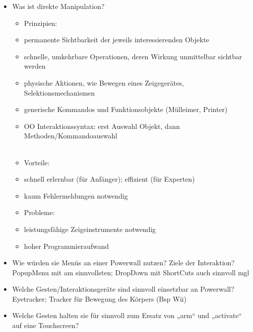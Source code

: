 \begin{itemize}
	\item Was ist direkte Manipulation?\\
	\begin{itemize}
		\item Prinzipien:
		\item permanente Sichtbarkeit der jeweils interessierenden Objekte
		\item schnelle, umkehrbare Operationen, deren Wirkung unmittelbar sichtbar werden
		\item physische Aktionen, wie Bewegen eines Zeigegerätes, Selektionsmechanismen
		\item generische Kommandos und Funktionsobjekte (Mülleimer, Printer)
		\item OO Interaktionssyntax: erst Auswahl Objekt, dann Methoden/Kommandoauswahl
		\\\\
		\item Vorteile:
		\item schnell erlernbar (für Anfänger); effizient (für Experten)
		\item kaum Fehlermeldungen notwendig
		\item Probleme:
		\item leistungsfähige Zeigeinstrumente notwendig
		\item hoher Programmieraufwand
	\end{itemize}
	\item Wie würden sie Menüs an einer Powerwall nutzen? Ziele der Interaktion?\\
	PopupMenu mit am sinnvollsten; DropDown mit ShortCuts auch sinnvoll mgl\\
	\item Welche Gesten/Interaktionsgeräte sind sinnvoll einsetzbar an Powerwall?\\
	Eyetracker; Tracker für Bewegung des Körpers (Bsp Wii)
	
	\item Welche Gesten halten sie für sinnvoll zum Ersatz von „arm“ und „activate“ auf eine Touchscreen?
\end{itemize}

